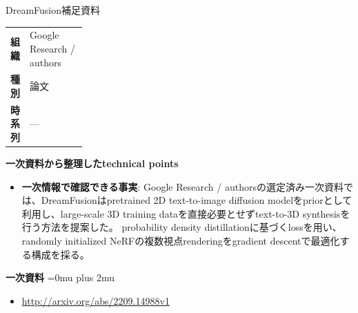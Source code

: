 \begin{technicalnote}{DreamFusion}{補足資料}
\begingroup
\begin{tabularx}{\linewidth}{@{}>{\bfseries}p{0.22\linewidth}X@{}}
組織 & Google Research / authors \\
種別 & 論文 \\
時系列 & — \\
\end{tabularx}
\smallskip
{\bfseries 一次資料から整理したtechnical points}
\begin{itemize}[leftmargin=1.5em,itemsep=0.35em]
\item \textbf{一次情報で確認できる事実}: Google Research / authorsの選定済み一次資料では、DreamFusionはpretrained 2D text-to-image diffusion modelをpriorとして利用し、large-scale 3D training dataを直接必要とせずtext-to-3D synthesisを行う方法を提案した。 probability density distillationに基づくlossを用い、randomly initialized NeRFの複数視点renderingをgradient descentで最適化する構成を採る。
\end{itemize}
\begin{minipage}{\linewidth}
\begin{samepage}
{\bfseries 一次資料}
\begingroup\sloppy
\Urlmuskip=0mu plus 2mu\relax
\begin{itemize}[leftmargin=1.5em,itemsep=0.25em]
\item {\scriptsize\url{http://arxiv.org/abs/2209.14988v1}}
\end{itemize}
\endgroup
\end{samepage}
\end{minipage}
\endgroup
\end{technicalnote}
\medskip
